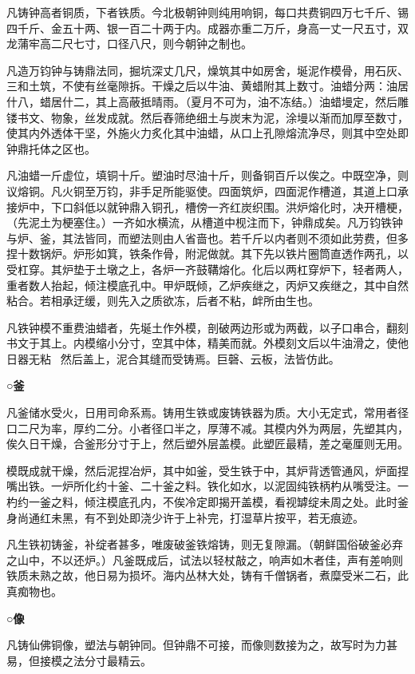 \documentclass[]{article}
\begin{document}
凡铸钟高者铜质，下者铁质。今北极朝钟则纯用响铜，每口共费铜四万七千斤、锡四千斤、金五十两、银一百二十两于内。成器亦重二万斤，身高一丈一尺五寸，双龙蒲牢高二尺七寸，口径八尺，则今朝钟之制也。

凡造万钧钟与铸鼎法同，掘坑深丈几尺，燥筑其中如房舍，埏泥作模骨，用石灰、三和土筑，不使有丝毫隙拆。干燥之后以牛油、黄蜡附其上数寸。油蜡分两：油居什八，蜡居什二，其上高蔽抵晴雨。（夏月不可为，油不冻结。）油蜡墁定，然后雕镂书文、物象，丝发成就。然后舂筛绝细土与炭末为泥，涂墁以渐而加厚至数寸，使其内外透体干坚，外施火力炙化其中油蜡，从口上孔隙熔流净尽，则其中空处即钟鼎托体之区也。

凡油蜡一斤虚位，填铜十斤。塑油时尽油十斤，则备铜百斤以俟之。中既空净，则议熔铜。凡火铜至万钧，非手足所能驱使。四面筑炉，四面泥作槽道，其道上口承接炉中，下口斜低以就钟鼎入铜孔，槽傍一齐红炭织围。洪炉熔化时，决开槽梗，（先泥土为梗塞住。）一齐如水横流，从槽道中枧注而下，钟鼎成矣。凡万钧铁钟与炉、釜，其法皆同，而塑法则由人省啬也。若千斤以内者则不须如此劳费，但多捏十数锅炉。炉形如箕，铁条作骨，附泥做就。其下先以铁片圈筒直透作两孔，以受杠穿。其炉垫于土墩之上，各炉一齐鼓鞲熔化。化后以两杠穿炉下，轻者两人，重者数人抬起，倾注模底孔中。甲炉既倾，乙炉疾继之，丙炉又疾继之，其中自然粘合。若相承迂缓，则先入之质欲冻，后者不粘，衅所由生也。

凡铁钟模不重费油蜡者，先埏土作外模，剖破两边形或为两截，以子口串合，翻刻书文于其上。内模缩小分寸，空其中体，精美而就。外模刻文后以牛油滑之，使他日器无粘，然后盖上，泥合其缝而受铸焉。巨磬、云板，法皆仿此。

\textbf{○釜}

凡釜储水受火，日用司命系焉。铸用生铁或废铸铁器为质。大小无定式，常用者径口二尺为率，厚约二分。小者径口半之，厚薄不减。其模内外为两层，先塑其内，俟久日干燥，合釜形分寸于上，然后塑外层盖模。此塑匠最精，差之毫厘则无用。

模既成就干燥，然后泥捏冶炉，其中如釜，受生铁于中，其炉背透管通风，炉面捏嘴出铁。一炉所化约十釜、二十釜之料。铁化如水，以泥固纯铁柄杓从嘴受注。一杓约一釜之料，倾注模底孔内，不俟冷定即揭开盖模，看视罅绽未周之处。此时釜身尚通红未黑，有不到处即浇少许于上补完，打湿草片按平，若无痕迹。

凡生铁初铸釜，补绽者甚多，唯废破釜铁熔铸，则无复隙漏。（朝鲜国俗破釜必弃之山中，不以还炉。）凡釜既成后，试法以轻杖敲之，响声如木者佳，声有差响则铁质未熟之故，他日易为损坏。海内丛林大处，铸有千僧锅者，煮糜受米二石，此真痴物也。

\textbf{○像}

凡铸仙佛铜像，塑法与朝钟同。但钟鼎不可接，而像则数接为之，故写时为力甚易，但接模之法分寸最精云。
\end{document}
